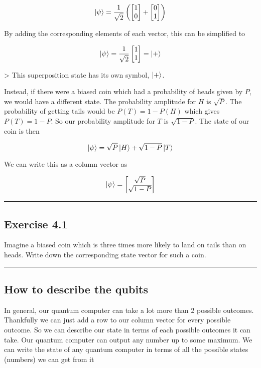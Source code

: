 \documentclass{book}
\begin{document}
$$ \ket{\psi} = \frac{1}{\sqrt{2}}\left(\begin{bmatrix}
1 \\ 0
\end{bmatrix}+ \begin{bmatrix}
0 \\ 1
\end{bmatrix}\right) $$

By adding the corresponding elements of each vector, this can be simplified to

$$ \ket{\psi} = \frac{1}{\sqrt{2}}\begin{bmatrix} 1 \\ 1 \end{bmatrix} = \ket{+}$$

> This superposition state has its own symbol, $\ket{+}$.

Instead, if there were a biased coin which had a probability of heads given by $P$, we would have a different state. The probability amplitude for $H$ is $\sqrt{P}$. The probability of getting tails would be $ P(T) = 1 - P(H)$ which gives $P(T) = 1 -P$. So our probability amplitude for $T$ is $\sqrt{1 - P}$. The state of our coin is then 

$$
\ket{\psi} = \sqrt{P}\ket{H} + \sqrt{1-P}\ket{T}
$$

We can write this as a column vector as

$$
\ket{\psi} = \begin{bmatrix}
\sqrt{P} \\ \sqrt{1-P}
\end{bmatrix}
$$


\hrule

\subsection{Exercise 4.1 }

Imagine a biased coin which is three times more likely to land on tails than on heads. Write down the corresponding state vector for such a coin.

\hrule
\subsection{How to describe the qubits}

In general, our quantum computer can take a lot more than 2 possible outcomes. Thankfully we can just add a row to our column vector for every possible outcome. So we can describe our state in terms of each possible outcomes it can take. Our quantum computer can output any number up to some maximum.  We can write the state of any quantum computer in terms of all the possible states (numbers) we can get from it
\end{document}
